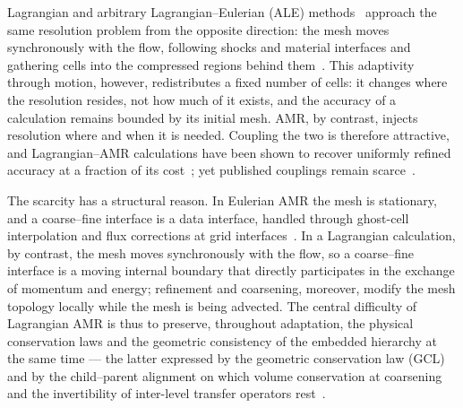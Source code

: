 \documentclass[a4paper]{cas-sc}
\begin{document}
Lagrangian and arbitrary Lagrangian--Eulerian (ALE) methods~\cite{hirt1974arbitrary,benson1992computational} approach the same resolution problem from the opposite direction: the mesh moves synchronously with the flow, following shocks and material interfaces and gathering cells into the compressed regions behind them~\cite{vonneumann1950method,wilkins1964calculation,caramana1998construction}. This adaptivity through motion, however, redistributes a fixed number of cells: it changes where the resolution resides, not how much of it exists, and the accuracy of a calculation remains bounded by its initial mesh. AMR, by contrast, injects resolution where and when it is needed. Coupling the two is therefore attractive, and Lagrangian--AMR calculations have been shown to recover uniformly refined accuracy at a fraction of its cost~\cite{anderson2004arbitrary,morrell2007cell,waltz2018coupled}; yet published couplings remain scarce~\cite{anderson2004arbitrary,morrell2007cell,koniges2006modeling,wang2010modeling,baiges2017adaptive,waltz2018coupled,colaitis2026cell}.

The scarcity has a structural reason. In Eulerian AMR the mesh is stationary, and a coarse--fine interface is a data interface, handled through ghost-cell interpolation and flux corrections at grid interfaces~\cite{berger1989local,berger1987conservation}. In a Lagrangian calculation, by contrast, the mesh moves synchronously with the flow, so a coarse--fine interface is a moving internal boundary that directly participates in the exchange of momentum and energy; refinement and coarsening, moreover, modify the mesh topology locally while the mesh is being advected. The central difficulty of Lagrangian AMR is thus to preserve, throughout adaptation, the physical conservation laws and the geometric consistency of the embedded hierarchy at the same time --- the latter expressed by the geometric conservation law (GCL)~\cite{thomas1979geometric,guillard2000significance,farhat2001discrete} and by the child--parent alignment on which volume conservation at coarsening and the invertibility of inter-level transfer operators rest~\cite{anderson2004arbitrary,waltz2018coupled}.
\end{document}
